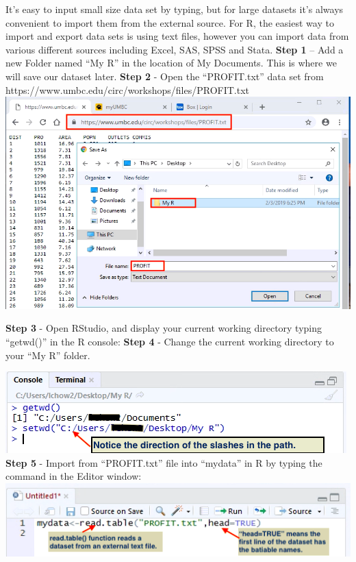 \documentclass[a4paper]{report}
\begin{document}
        \begin{flushleft}
        It’s easy to input small size data set by typing, but for large datasets it’s always convenient to import them from the external source. For R, the easiest way to import and export data sets is using text files, however you can import data from various different sources including Excel, SAS, SPSS and Stata. 
        \newline\newline
        \textbf{Step 1} – Add a new Folder named “My R” in the location of My Documents. This is where we will save our dataset later.
        \newline \newline 
        \textbf{Step 2} - Open the ``PROFIT.txt'' data set from https://www.umbc.edu/circ/workshops/files/PROFIT.txt
        \includegraphics[width=\textwidth]{images/ID1.png}
        \newline\newline
        
        \textbf{Step 3} - Open RStudio, and display your current working directory typing ``getwd()'' in the R console:
        \newline \newline
        \textbf{Step 4} - Change the current working directory to your ``My R'' folder. 
        
        \includegraphics[width=\textwidth]{images/ID2.png}
        \newpage
        \textbf{Step 5} - Import from “PROFIT.txt” file into “mydata” in R by typing the command in the Editor window:
        \includegraphics[width=\textwidth]{images/ID3.png}
        

\end{flushleft}
\end{document}
